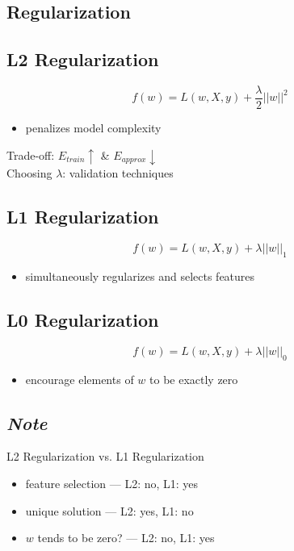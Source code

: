 \documentclass[10pt,landscape,a4paper]{article}
\begin{document}
\begin{multicols*}{5}
\section{Regularization}

\subsection{L2 Regularization}
\begin{dmath*}
    f(w) = L(w,X,y) + \frac{\lambda}{2} ||w||^2
\end{dmath*}
\begin{itemize}
    \item penalizes model complexity
\end{itemize}
Trade-off: \(E_{train} \uparrow \) \& \(E_{approx} \downarrow \) \\
Choosing \(\lambda \): validation techniques

\subsection{L1 Regularization}
\begin{dmath*}
    f(w) = L(w,X,y) + \lambda ||w||_1
\end{dmath*}
\begin{itemize}
    \item simultaneously regularizes and selects features
\end{itemize}

\subsection{L0 Regularization}
\begin{dmath*}
    f(w) = L(w,X,y) + \lambda ||w||_0
\end{dmath*}
\begin{itemize}
    \item encourage elements of \(w\) to be exactly zero
\end{itemize}

\subsection{\emph{Note}}
L2 Regularization vs. L1 Regularization \\
\begin{itemize}
    \item feature selection --- L2: no, L1: yes
    \item unique solution --- L2: yes, L1: no
    \item \(w\) tends to be zero? --- L2: no, L1: yes
\end{itemize}


\end{multicols*}
\end{document}
